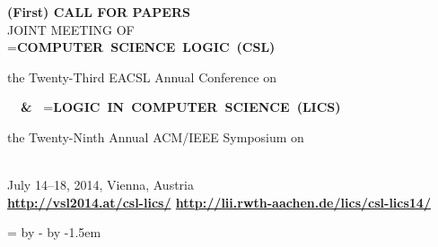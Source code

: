 \documentclass[oneside]{article}
\begin{document}
\pagestyle{empty}
\raggedbottom

\newbox\nbox
\newcommand\titlestyle{\large\bfseries}

\begin{center}
  \textbf{(First) CALL FOR PAPERS} \\[1ex]
  {\large JOINT MEETING OF} \\[1ex]
  \setbox\nbox=\hbox{\titlestyle COMPUTER SCIENCE LOGIC (CSL)}
  \begin{minipage}[b]{\wd\nbox} \centering
    the Twenty-Third EACSL Annual Conference on \\[.2ex]
    {\box\nbox}
  \end{minipage}
  \ {\titlestyle\ \&\ }
  \setbox\nbox=\hbox{\titlestyle LOGIC IN COMPUTER SCIENCE (LICS)}
  \begin{minipage}[b]{\wd\nbox} \centering
    the Twenty-Ninth Annual ACM/IEEE Symposium on \\[.2ex]
    {\box\nbox}
  \end{minipage}
  \\[1ex]
  July 14--18, 2014, Vienna, Austria \\[1ex]
  {\bfseries \url{http://vsl2014.at/csl-lics/}
             \quad
             \url{http://lii.rwth-aachen.de/lics/csl-lics14/}
  }
\end{center}

\vspace{1mm}

\newdimen\leftcol
\leftcol=4.7cm
\newdimen\rightcol
\rightcol=\linewidth
\advance\rightcol by -\leftcol
\advance\rightcol by -1.5em
\let\oldframebox=\framebox
\let\framebox=\relax

\end{document}
